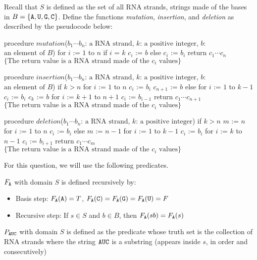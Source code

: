 Recall that $S$ is defined as the set of all RNA strands, strings made of the bases in 
 $B = \{\texttt{A},\texttt{U},\texttt{G},\texttt{C}\}$. Define the functions \textit{mutation}, \textit{insertion}, and \textit{deletion} as described by the pseudocode below:

\begin{algorithm}
procedure $\textit{mutation}$($b_1\cdots b_n$: $\textrm{a RNA strand}$, $k$: $\textrm{a  positive integer}$, $b$: $\textrm{an  element of } B$)
for $i$ := $1$ to $n$
  if $i$ = $k$
    $c_i$ := $b$
  else
    $c_i$ := $b_i$
return $c_1\cdots c_n$ $\{ \textrm{The return value is a RNA strand made of the } c_i \textrm{ values}\}$
\end{algorithm}

\begin{algorithm}
procedure $\textit{insertion}$($b_1\cdots b_n$: $\textrm{a RNA strand}$, $k$: $\textrm{a  positive integer}$, $b$: $\textrm{an  element of } B$)
if $k > n$
  for $i$ := $1$ to $n$
    $c_i$ := $b_i$
  $c_{n+1}$ := $b$
else 
  for $i$ := $1$ to $k-1$
    $c_i$ := $b_i$
  $c_k$ := $b$
  for $i$ := $k+1$ to $n+1$
    $c_i$ := $b_{i-1}$
return $c_1\cdots c_{n+1}$ $\{ \textrm{The return value is a RNA strand made of the } c_i \textrm{ values}\}$
\end{algorithm}

\begin{algorithm}
procedure $\textit{deletion}$($b_1\cdots b_n$: $\textrm{a RNA strand}$, $k$: $\textrm{a  positive integer}$)
if $k > n$
  $m$ := $n$
  for $i$ := $1$ to $n$
    $c_i$ := $b_i$
else
  $m$ := $n-1$
  for $i$ := $1$ to $k-1$ 
    $c_i$ := $b_i$
  for $i$ := $k$ to $n-1$
    $c_i$ := $b_{i+1}$
return $c_1\cdots c_m$ $\{ \textrm{The return value is a RNA strand made of the } c_i \textrm{ values}\}$
\end{algorithm}

For this question, we will use the following predicates.

$F_{\texttt{A}}$ with domain $S$ is defined recursively by: 
\begin{itemize}
\item[]Basis step: $F_{\texttt{A}}(\texttt{A}) = T$, $F_{\texttt{A}}(\texttt{C}) = F_{\texttt{A}}(\texttt{G}) = F_{\texttt{A}}(\texttt{U}) = F$
\item[]Recursive step: If $s \in S$ and $b \in B$, then $F_{\texttt{A}}(sb) = F_{\texttt{A}}(s)$
\end{itemize}

$P_{\texttt{A}\texttt{U}\texttt{C}}$ with domain $S$ is defined as the predicate whose truth set
is the collection of RNA strands where the string $\texttt{A}\texttt{U}\texttt{C}$
is a substring (appears inside $s$, in order and consecutively)

